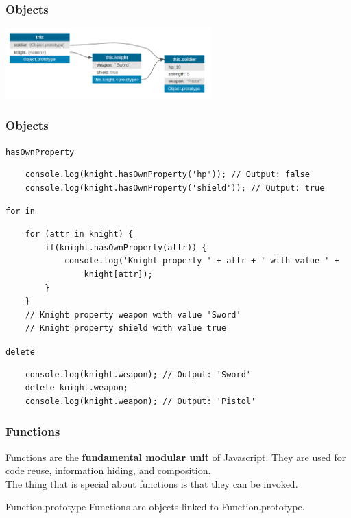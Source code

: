 \begin{frame}[fragile]
  \frametitle{Objects}
  \begin{center}
    \includegraphics[width=300px]{images/object_create.png}
  \end{center}
\end{frame}

\begin{frame}[fragile]
  \frametitle{Objects}
  \begin{block}{\texttt{hasOwnProperty}}
    {\scriptsize
    \begin{verbatim}
    console.log(knight.hasOwnProperty('hp')); // Output: false
    console.log(knight.hasOwnProperty('shield')); // Output: true
    \end{verbatim}
    }
  \end{block}

  \pause

  \begin{block}{\texttt{for in}}
    {\scriptsize
    \begin{verbatim}
    for (attr in knight) {
        if(knight.hasOwnProperty(attr)) {
            console.log('Knight property ' + attr + ' with value ' + 
                knight[attr]);  
        }
    }
    // Knight property weapon with value 'Sword'
    // Knight property shield with value true
    \end{verbatim}
    }
  \end{block}
  
  \pause

  \begin{block}{\texttt{delete}}
    {\scriptsize
    \begin{verbatim}
    console.log(knight.weapon); // Output: 'Sword'
    delete knight.weapon;
    console.log(knight.weapon); // Output: 'Pistol'
    \end{verbatim}
    }
  \end{block}
\end{frame}

\begin{frame}[fragile]
  \frametitle{Functions}

  Functions are the \textbf{fundamental modular unit} of Javascript. They are used for code reuse, information hiding, and composition. \\

  The thing that is special about functions is that they can be invoked.
  \pause

  \begin{block}{Function.prototype}
  Functions are objects linked to Function.prototype.
  \end{block}
\end{frame}

